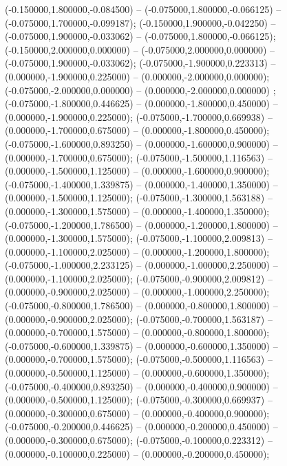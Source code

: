  (-0.150000,1.800000,-0.084500) -- (-0.075000,1.800000,-0.066125) -- (-0.075000,1.700000,-0.099187);
 (-0.150000,1.900000,-0.042250) -- (-0.075000,1.900000,-0.033062) -- (-0.075000,1.800000,-0.066125);
 (-0.150000,2.000000,0.000000) -- (-0.075000,2.000000,0.000000) -- (-0.075000,1.900000,-0.033062);
 (-0.075000,-1.900000,0.223313) -- (0.000000,-1.900000,0.225000) -- (0.000000,-2.000000,0.000000);
 (-0.075000,-2.000000,0.000000) -- (0.000000,-2.000000,0.000000) ;
 (-0.075000,-1.800000,0.446625) -- (0.000000,-1.800000,0.450000) -- (0.000000,-1.900000,0.225000);
 (-0.075000,-1.700000,0.669938) -- (0.000000,-1.700000,0.675000) -- (0.000000,-1.800000,0.450000);
 (-0.075000,-1.600000,0.893250) -- (0.000000,-1.600000,0.900000) -- (0.000000,-1.700000,0.675000);
 (-0.075000,-1.500000,1.116563) -- (0.000000,-1.500000,1.125000) -- (0.000000,-1.600000,0.900000);
 (-0.075000,-1.400000,1.339875) -- (0.000000,-1.400000,1.350000) -- (0.000000,-1.500000,1.125000);
 (-0.075000,-1.300000,1.563188) -- (0.000000,-1.300000,1.575000) -- (0.000000,-1.400000,1.350000);
 (-0.075000,-1.200000,1.786500) -- (0.000000,-1.200000,1.800000) -- (0.000000,-1.300000,1.575000);
 (-0.075000,-1.100000,2.009813) -- (0.000000,-1.100000,2.025000) -- (0.000000,-1.200000,1.800000);
 (-0.075000,-1.000000,2.233125) -- (0.000000,-1.000000,2.250000) -- (0.000000,-1.100000,2.025000);
 (-0.075000,-0.900000,2.009812) -- (0.000000,-0.900000,2.025000) -- (0.000000,-1.000000,2.250000);
 (-0.075000,-0.800000,1.786500) -- (0.000000,-0.800000,1.800000) -- (0.000000,-0.900000,2.025000);
 (-0.075000,-0.700000,1.563187) -- (0.000000,-0.700000,1.575000) -- (0.000000,-0.800000,1.800000);
 (-0.075000,-0.600000,1.339875) -- (0.000000,-0.600000,1.350000) -- (0.000000,-0.700000,1.575000);
 (-0.075000,-0.500000,1.116563) -- (0.000000,-0.500000,1.125000) -- (0.000000,-0.600000,1.350000);
 (-0.075000,-0.400000,0.893250) -- (0.000000,-0.400000,0.900000) -- (0.000000,-0.500000,1.125000);
 (-0.075000,-0.300000,0.669937) -- (0.000000,-0.300000,0.675000) -- (0.000000,-0.400000,0.900000);
 (-0.075000,-0.200000,0.446625) -- (0.000000,-0.200000,0.450000) -- (0.000000,-0.300000,0.675000);
 (-0.075000,-0.100000,0.223312) -- (0.000000,-0.100000,0.225000) -- (0.000000,-0.200000,0.450000);
